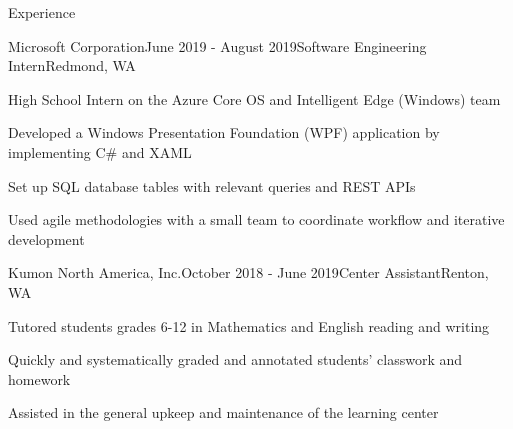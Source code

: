 \documentclass{resume} %
\begin{document}

\begin{rSection}{Experience}

\begin{rSubsection}{Microsoft Corporation}{June 2019 - August 2019}{Software Engineering Intern}{Redmond, WA}
\item High School Intern on the Azure Core OS and Intelligent Edge (Windows) team
\item Developed a Windows Presentation Foundation (WPF)  application by implementing C\# and XAML
\item Set up SQL database tables with relevant queries and REST APIs
\item Used agile methodologies with a small team to coordinate workflow and iterative development
\end{rSubsection}


\begin{rSubsection}{Kumon North America, Inc.}{October 2018 - June 2019}{Center Assistant}{Renton, WA}
\item Tutored students grades 6-12 in Mathematics and English reading and writing
\item Quickly and systematically graded and annotated students' classwork and homework
\item Assisted in the general upkeep and maintenance of the learning center
\end{rSubsection}

\end{rSection}

\end{document}
